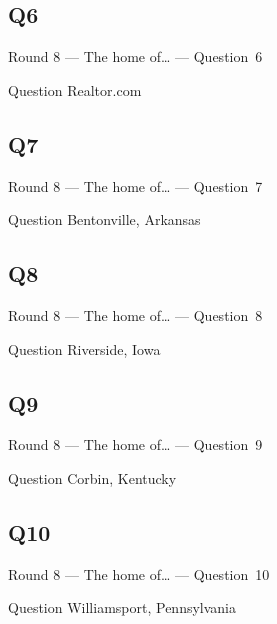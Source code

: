 \documentclass[11pt]{beamer}
\begin{document}
\subsection*{Q6}
\begin{frame}[t]{Round 8 --- The home of\ldots{} --- \mbox{Question 6}}
\vspace{-0.5em}
\begin{block}{Question}
Realtor.com
\end{block}
\end{frame}
\subsection*{Q7}
\begin{frame}[t]{Round 8 --- The home of\ldots{} --- \mbox{Question 7}}
\vspace{-0.5em}
\begin{block}{Question}
Bentonville, Arkansas
\end{block}
\end{frame}
\subsection*{Q8}
\begin{frame}[t]{Round 8 --- The home of\ldots{} --- \mbox{Question 8}}
\vspace{-0.5em}
\begin{block}{Question}
Riverside, Iowa
\end{block}
\end{frame}
\subsection*{Q9}
\begin{frame}[t]{Round 8 --- The home of\ldots{} --- \mbox{Question 9}}
\vspace{-0.5em}
\begin{block}{Question}
Corbin, Kentucky
\end{block}
\end{frame}
\subsection*{Q10}
\begin{frame}[t]{Round 8 --- The home of\ldots{} --- \mbox{Question 10}}
\vspace{-0.5em}
\begin{block}{Question}
Williamsport, Pennsylvania
\end{block}
\end{frame}
\end{document}
